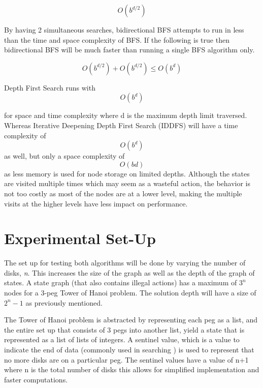 \documentclass[conference]{IEEEtran}
\begin{document}
\begin{equation}
 O(b^{d/2})
\end{equation}

By having 2 simultaneous searches, bidirectional BFS attempts to run in less than the time and space complexity of BFS. If 
the following is true then bidirectional BFS will be much faster than running a single BFS algorithm only. \cite{Textbook01}

\begin{equation}
O(b^{d/2}) + O(b^{d/2}) \leq O(b^d)
\end{equation}

Depth First Search runs with 
\begin{equation}
 O(b^{d})
\end{equation}

for space and time complexity where d is the maximum depth limit traversed. Whereas Iterative Deepening Depth First Search (IDDFS) will have a time complexity of \begin{equation}
O(b^{d})
\end{equation} as well, but only a space complexity of \begin{equation} O(bd)\end{equation} as less memory is used for node storage on limited depths. Although the states are visited multiple times which may seem as a wasteful action, the behavior is not too costly as most of the nodes are at a lower level, making the multiple visits at the higher levels have less impact on performance.


\section{Experimental Set-Up}
The set up for testing both algorithms will be done by varying the number of disks, \textit{n}. This increases the size of the graph as well as the depth of the graph of states. A state graph (that also contains illegal actions) has a maximum of $3^n$ nodes for a 3-peg Tower of Hanoi problem. The solution depth will have a size of $2^n-1$ as previously mentioned.

The Tower of Hanoi problem is abstracted by representing each peg as a list, and the entire set up that consists of 3 pegs into another list, yield a state that is represented as a list of lists of integers. A sentinel value, which is a value to indicate the end of data (commonly used in searching \cite{CodeComplete}) is used to represent that no more disks are on a particular peg. The sentinel values have a value of {n+1} where {n} is the total number of disks this allows for simplified implementation and faster computations.
\end{document}
